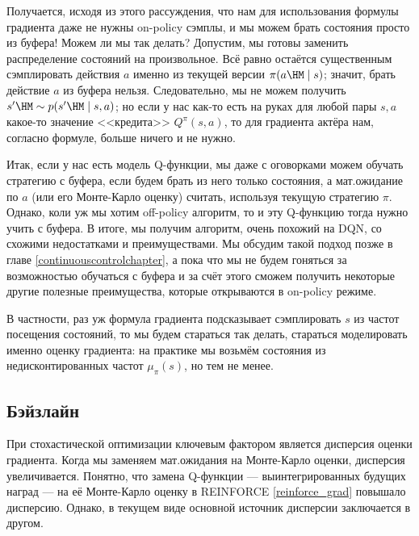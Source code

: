 Получается, исходя из этого рассуждения, что нам для использования формулы градиента даже не нужны on-policy сэмплы, и мы можем брать состояния просто из буфера! Можем ли мы так делать? Допустим, мы готовы заменить распределение состояний на произвольное. Всё равно остаётся существенным сэмплировать действия $a$ именно из текущей версии $\pi(a \HM\mid s)$; значит, брать действие $a$ из буфера нельзя. Следовательно, мы не можем получить $s' \HM\sim p(s' \HM\mid s, a)$; но если у нас как-то есть на руках для любой пары $s, a$ какое-то значение <<кредита>> $Q^\pi(s, a)$, то для градиента актёра нам, согласно формуле, больше ничего и не нужно.

Итак, если у нас есть модель Q-функции, мы даже с оговорками можем обучать стратегию с буфера, если будем брать из него только состояния, а мат.ожидание по $a$ (или его Монте-Карло оценку) считать, используя текущую стратегию $\pi$. Однако, коли уж мы хотим off-policy алгоритм, то и эту Q-функцию тогда нужно учить с буфера. В итоге, мы получим алгоритм, очень похожий на DQN, со схожими недостатками и преимуществами. Мы обсудим такой подход позже в главе \ref{continuouscontrolchapter}, а пока что мы не будем гоняться за возможностью обучаться с буфера и за счёт этого сможем получить некоторые другие полезные преимущества, которые открываются в on-policy режиме.

В частности, раз уж формула градиента подсказывает сэмплировать $s$ из частот посещения состояний, то мы будем стараться так делать, стараться моделировать именно оценку градиента: на практике мы возьмём состояния из недисконтированных частот $\mu_\pi(s)$, но тем не менее.

\subsection{Бэйзлайн}

При стохастической оптимизации ключевым фактором является дисперсия оценки градиента. Когда мы заменяем мат.ожидания на Монте-Карло оценки, дисперсия увеличивается. Понятно, что замена Q-функции --- выинтегрированных будущих наград --- на её Монте-Карло оценку в REINFORCE \eqref{reinforce_grad} повышало дисперсию. Однако, в текущем виде основной источник дисперсии заключается в другом.


